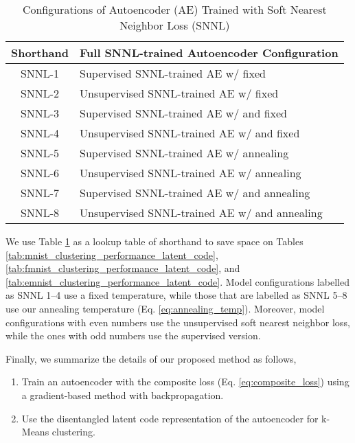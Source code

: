 \documentclass[conference]{IEEEtran}
\begin{document}
\begin{table}[htb]
    \caption{Configurations of Autoencoder (AE) Trained with Soft Nearest Neighbor Loss (SNNL)}
    \label{tab:model_lookup}
    \centering
    \begin{tabular}{c|l}
        \toprule
         Shorthand & Full SNNL-trained Autoencoder Configuration \\ 
        \midrule
         SNNL-1 & Supervised SNNL-trained AE w/ fixed  \\
         SNNL-2 & Unsupervised SNNL-trained AE w/ fixed  \\
         SNNL-3 & Supervised SNNL-trained AE w/  and fixed \\
         SNNL-4 & Unsupervised SNNL-trained AE w/  and fixed \\
         SNNL-5 & Supervised SNNL-trained AE w/ annealing \\
         SNNL-6 & Unsupervised SNNL-trained AE w/ annealing \\
         SNNL-7 & Supervised SNNL-trained AE w/  and annealing \\
         SNNL-8 & Unsupervised SNNL-trained AE w/  and annealing \\
        \bottomrule
    \end{tabular}
\end{table}

We use Table \ref{tab:model_lookup} as a lookup table of shorthand to save space on Tables \ref{tab:mnist_clustering_performance_latent_code}, \ref{tab:fmnist_clustering_performance_latent_code}, and \ref{tab:emnist_clustering_performance_latent_code}. Model configurations labelled as SNNL 1--4 use a fixed temperature, while those that are labelled as SNNL 5--8 use our annealing temperature (Eq. \ref{eq:annealing_temp}). Moreover, model configurations with even numbers use the unsupervised soft nearest neighbor loss, while the ones with odd numbers use the supervised version.

Finally, we summarize the details of our proposed method as follows,

\begin{enumerate}
    \item Train an autoencoder with the composite loss (Eq. \ref{eq:composite_loss}) using a gradient-based method with backpropagation.
    \item Use the disentangled latent code representation  of the autoencoder for k-Means clustering.
\end{enumerate}
\end{document}
